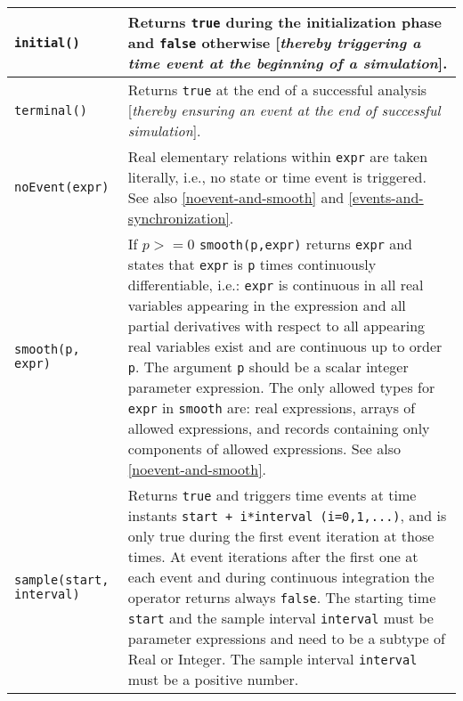 \begin{longtable}{|p{5cm}|p{8cm}|} 
\hline \endhead

\lstinline!initial()! & Returns \lstinline!true! during the initialization phase and \lstinline!false!
otherwise {[}\emph{thereby triggering a time event at the beginning of a
simulation}{]}.\\ \hline

\lstinline!terminal()! & Returns \lstinline!true! at the end of a successful analysis
{[}\emph{thereby ensuring an event at the end of successful
simulation}{]}.\\ \hline

\lstinline!noEvent(expr)! & Real elementary relations within \lstinline!expr! are taken literally, i.e., no state or time event is triggered. See also \autoref{noevent-and-smooth} and \autoref{events-and-synchronization}.\\ \hline

\lstinline!smooth(p, expr)! & If $p>=0$ \lstinline!smooth(p,expr)!
returns \lstinline!expr! and states that \lstinline!expr! is \lstinline!p! times continuously
differentiable, i.e.: \lstinline!expr! is continuous in all real variables appearing
in the expression and all partial derivatives with respect to all
appearing real variables exist and are continuous up to order
\lstinline!p!. The argument \lstinline!p! should be a scalar integer parameter
expression. The only allowed types for \lstinline!expr! in \lstinline!smooth! are: real
expressions, arrays of allowed expressions, and records containing only
components of allowed expressions. See also \autoref{noevent-and-smooth}.\\ \hline

\lstinline!sample(start, interval)! & Returns \lstinline!true! and triggers time events at time
instants \lstinline!start + i*interval (i=0,1,...)!, and is only true during the first event iteration at those times.
At event iterations after the first one at each event and during continuous integration 
the operator returns always \lstinline!false!. The starting time \lstinline!start! and the 
sample interval \lstinline!interval! must be parameter expressions and need to be 
a subtype of Real or Integer. The sample interval \lstinline!interval! must be a
positive number.\\ \hline


\end{longtable}
